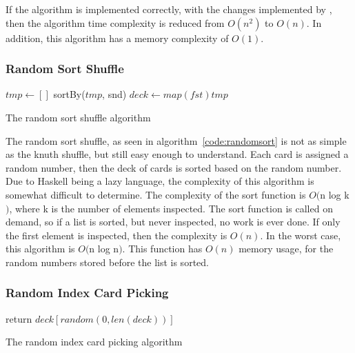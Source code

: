 If the algorithm is implemented correctly, with the changes implemented by
\parencite{richard1964}, then the algorithm time complexity is reduced from
$O(n^2)$ to $O(n)$. In addition, this algorithm has a memory complexity of
$O(1)$.

\subsubsection{Random Sort Shuffle}

\vspace{0.3cm}

\begin{algorithm}[H]
    \BlankLine{}
     $tmp \leftarrow []$\;
     
     sortBy($tmp$, snd)\;
     $deck \leftarrow map (fst) tmp$\;
\caption{The random sort shuffle algorithm}
\label{code:randomsort}
\end{algorithm}

\vspace{0.3cm}

The random sort shuffle, as seen in algorithm~\ref{code:randomsort} is not as
simple as the knuth shuffle, but still easy enough to understand. Each card
is assigned a random number, then the deck of cards is sorted based on the
random number. Due to Haskell being a lazy language, the complexity of this
algorithm is somewhat difficult to determine. The complexity of the sort
function is $O($n log k$)$, where k is the number of elements inspected. The
sort function is called on demand, so if a list is sorted, but never inspected,
no work is ever done. If only the first element is inspected, then the
complexity is $O(n)$. In the worst case, this algorithm is $O($n log n$)$.
This function has $O(n)$ memory usage, for the random numbers stored before
the list is sorted.

\subsubsection{Random Index Card Picking}

\vspace{0.3cm}

\begin{algorithm}[H]
    \BlankLine{}
     return $deck[random(0, len(deck))]$\;
\caption{The random index card picking algorithm}
\label{code:randomsort}
\end{algorithm}

